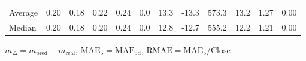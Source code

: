 \begin{threeparttable}
{\begin{tabular}{lrrrrrrrrrrr}
Average &          0.20 &          0.18 &          0.22 &        0.24 &                 0.0 &                13.3 &      -13.3 &               573.3 &             13.2 &            1.27 &                   0.00 \\
 Median &          0.20 &          0.18 &          0.20 &        0.24 &                 0.0 &                12.8 &      -12.7 &               555.2 &             12.2 &            1.21 &                   0.00 \\
\bottomrule
\end{tabular}
}
\begin{tablenotes}\footnotesize
\item $m_\Delta=m_{\text{pred}}-m_{\text{real}}$,
$\mathrm{MAE}_5=\mathrm{MAE}_{5\text{d}}$,
$\mathrm{RMAE}=\mathrm{MAE}_5/\text{Close}$
\end{tablenotes}
\end{threeparttable}
\endgroup

